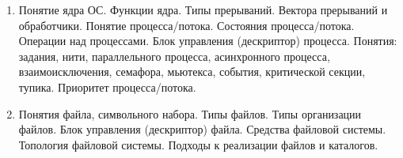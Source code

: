 % 
%

\begin{enumerate}
\item Понятие ядра ОС. Функции ядра. Типы прерываний. Вектора прерываний и обработчики. Понятие процесса/потока. Состояния процесса/потока. Операции над процессами. Блок управления (дескриптор) процесса. Понятия: задания, нити, параллельного процесса, асинхронного процесса, взаимоисключения, семафора, мьютекса, события, критической секции, тупика. Приоритет процесса/потока.

\item Понятия файла, символьного набора. Типы файлов. Типы организации файлов. Блок управления (дескриптор) файла. Средства файловой системы. Топология файловой системы. Подходы к реализации файлов и каталогов.
\end{enumerate}